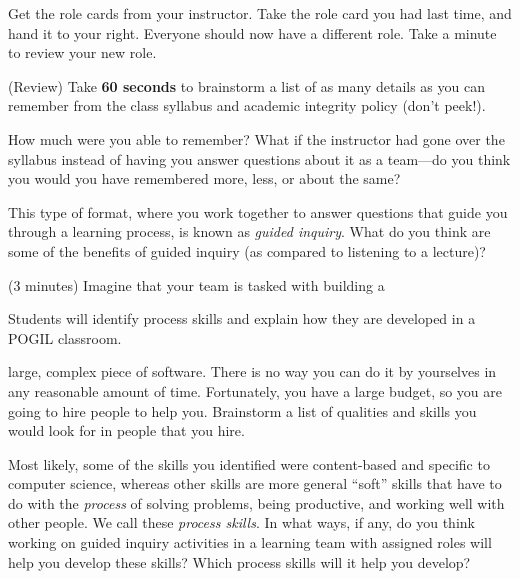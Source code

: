 \documentclass{tufte-handout}
\begin{document}
\begin{questions}
\item Get the role cards from your instructor.  Take the role card you
  had last time, and hand it to your right.  Everyone should now have
  a different role.  Take a minute to review your new role.

\item (Review) Take \textbf{60 seconds} to brainstorm a list of as
  many details as you can remember from the class syllabus and
  academic integrity policy (don't peek!).  \vspace{1in}

\item How much were you able to remember?  What if the instructor had
  gone over the syllabus instead of having you answer questions about
  it as a team---do you think you would you have remembered more,
  less, or about the same? \vspace{0.5in}

\item This type of format, where you work together to answer questions
  that guide you through a learning process, is known as \emph{guided
    inquiry}.  What do you think are some of the benefits of guided
  inquiry (as compared to listening to a lecture)?  

\newpage

\item (3 minutes) Imagine that your team is tasked with building a
\begin{objective}
  Students will identify process skills and explain how they are
  developed in a POGIL classroom.
\end{objective}
  large, complex piece of software.  There is no way you can do it by
  yourselves in any reasonable amount of time.  Fortunately, you have
  a large budget, so you are going to hire people to help
  you. Brainstorm a list of qualities and skills you would look for in
  people that you hire.

\item Most likely, some of the skills you identified were
  content-based and specific to computer science, whereas other skills
  are more general ``soft'' skills that have to do with the
  \emph{process} of solving problems, being productive, and working
  well with other people.  We call these \emph{process skills}.  In
  what ways, if any, do you think working on guided inquiry activities
  in a learning team with assigned roles will help you develop these
  skills?  Which process skills will it help you develop?

\end{questions}
\end{document}
